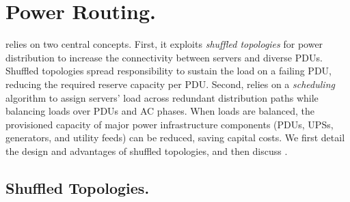\section{Power Routing.}
\label{section::powerrouting}


\PowerRouting relies on two central concepts.  First, it exploits \emph{shuffled topologies} for power distribution to increase the connectivity between servers and diverse PDUs.  Shuffled topologies spread responsibility to sustain the load on a failing PDU, reducing the required reserve capacity per PDU.  Second, \PowerRouting relies on a \emph{scheduling} algorithm to assign servers' load across redundant distribution paths while balancing loads over PDUs and AC phases.  When loads are balanced, the provisioned capacity of major power infrastructure components (PDUs, UPSs, generators, and utility feeds) can be reduced, saving capital costs.  We first detail the design and advantages of shuffled topologies, and then discuss \PowerRouting.

\subsection{Shuffled Topologies.}
\label{section::intermixed}

